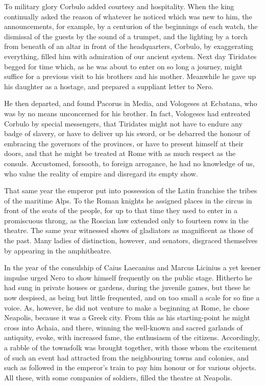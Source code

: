 
To military glory Corbulo added courtesy and hospitality. When the king continually asked the reason of whatever he noticed which was new to him, the announcements, for example, by a centurion of the beginnings of each watch, the dismissal of the guests by the sound of a trumpet, and the lighting by a torch from beneath of an altar in front of the headquarters, Corbulo, by exaggerating everything, filled him with admiration of our ancient system. Next day Tiridates begged for time which, as he was about to enter on so long a journey, might suffice for a previous visit to his brothers and his mother. Meanwhile he gave up his daughter as a hostage, and prepared a suppliant letter to Nero.


He then departed, and found Pacorus in Media, and Vologeses at Ecbatana, who was by no means unconcerned for his brother. In fact, Vologeses had entreated Corbulo by special messengers, that Tiridates might not have to endure any badge of slavery, or have to deliver up his sword, or be debarred the honour of embracing the governors of the provinces, or have to present himself at their doors, and that he might be treated at Rome with as much respect as the consuls. Accustomed, forsooth, to foreign arrogance, he had no knowledge of us, who value the reality of empire and disregard its empty show.


That same year the emperor put into possession of the Latin franchise the tribes of the maritime Alps. To the Roman knights he assigned places in the circus in front of the seats of the people, for up to that time they used to enter in a promiscuous throng, as the Roscian law extended only to fourteen rows in the theatre. The same year witnessed shows of gladiators as magnificent as those of the past. Many ladies of distinction, however, and senators, disgraced themselves by appearing in the amphitheatre.


In the year of the consulship of Caius Laecanius and Marcus Licinius a yet keener impulse urged Nero to show himself frequently on the public stage. Hitherto he had sung in private houses or gardens, during the juvenile games, but these he now despised, as being but little frequented, and on too small a scale for so fine a voice. As, however, he did not venture to make a beginning at Rome, he chose Neapolis, because it was a Greek city. From this as his starting-point he might cross into Achaia, and there, winning the well-known and sacred garlands of antiquity, evoke, with increased fame, the enthusiasm of the citizens. Accordingly, a rabble of the townsfolk was brought together, with those whom the excitement of such an event had attracted from the neighbouring towns and colonies, and such as followed in the emperor's train to pay him honour or for various objects. All these, with some companies of soldiers, filled the theatre at Neapolis.

